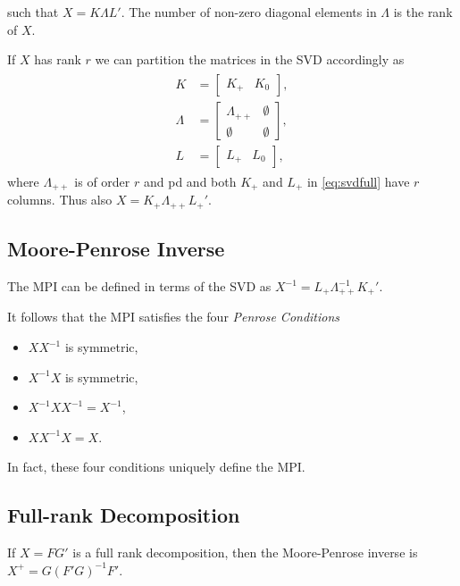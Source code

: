 \documentclass[
  12pt,
]{book}
\providecommand{\tightlist}{%
  \setlength{\itemsep}{0pt}\setlength{\parskip}{0pt}}
\theoremstyle{definition}
\theoremstyle{definition}
\theoremstyle{definition}
\theoremstyle{definition}
\theoremstyle{remark}
\begin{document}
such that \(X=K\Lambda L'\). The number of non-zero diagonal elements in \(\Lambda\) is the rank of \(X\).

If \(X\) has rank \(r\) we can partition the matrices in the SVD accordingly as
\begin{align}
\begin{split}
K&=\begin{bmatrix}K_+&K_0\end{bmatrix},\\
\Lambda&=\begin{bmatrix}\Lambda_{++}&\emptyset\\\emptyset&\emptyset\end{bmatrix},\\
L&=\begin{bmatrix}L_+&L_0\end{bmatrix},
\end{split}
\label{eq:svdfull}
\end{align}
where \(\Lambda_{++}\) is of order \(r\) and pd and both \(K_+\) and \(L_+\) in \eqref{eq:svdfull} have \(r\) columns. Thus also \(X=K_+^{\ }\Lambda_{++}^{\ }L_+'\).

\hypertarget{apmpi}{%
\subsection{Moore-Penrose Inverse}\label{apmpi}}

The MPI can be defined in terms of the SVD as \(X^{-1}=L_+\Lambda_{++}^{-1}K_+'\).

It follows that the MPI satisfies the four \emph{Penrose Conditions}

\begin{itemize}
\tightlist
\item
  \(XX^{-1}\) is symmetric,
\item
  \(X^{-1}X\) is symmetric,
\item
  \(X^{-1}XX^{-1}=X^{-1}\),
\item
  \(XX^{-1}X=X\).
\end{itemize}

In fact, these four conditions uniquely define the MPI.

\hypertarget{apfullrank}{%
\subsection{Full-rank Decomposition}\label{apfullrank}}

If \(X=FG'\) is a full rank decomposition, then
the Moore-Penrose inverse is \(X^+=G(F'G)^{-1}F'\).
\end{document}
